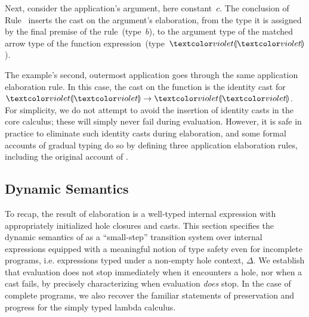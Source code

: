 Next, consider the application's argument, here constant~$c$.
%
The conclusion of Rule~ inserts the cast on the argument's
elaboration, from the type it is assigned by the final premise of the
rule~(type~$b$), to the argument type of the matched arrow type of the
function expression~(type~$\tehole$).

The example's second, outermost application goes through the same
application elaboration rule.
%
In this case, the cast on the function is the identity cast for
$\tarr{\tehole}{\tehole}$.
%
For simplicity, we do not attempt to avoid the insertion of identity
casts in the core calculus; these will simply never fail during
evaluation.
%
However, it is safe in practice to eliminate such identity casts during
elaboration, and some formal accounts of gradual typing do so by defining
three application elaboration rules, including the original account of
\citet{Siek06a}.

\subsection{Dynamic Semantics}
\label{sec:evaluation}

To recap, the result of elaboration is a well-typed internal expression
with appropriately initialized hole closures and casts.  This section
specifies the dynamic semantics of \HazelnutLive as a ``small-step''
transition system over internal expressions equipped with a meaningful
notion of type safety even for incomplete programs, i.e. expressions typed
under a non-empty hole context, $\Delta$.  We establish that evaluation
does not stop immediately when it encounters a hole, nor when a cast fails,
by precisely characterizing when evaluation \emph{does} stop. In the case
of complete programs, we also recover the familiar statements of preservation
and progress for the simply typed lambda calculus.

%
%





